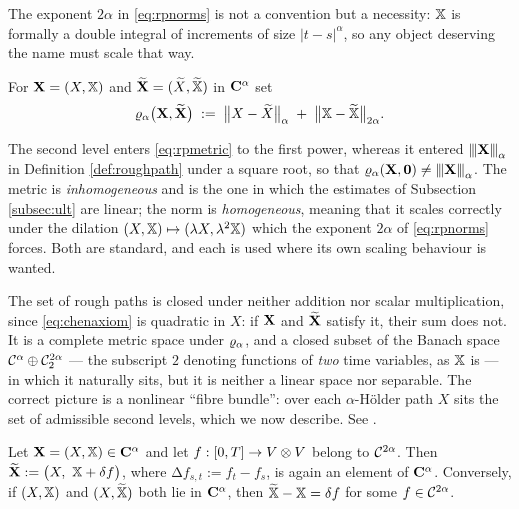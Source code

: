 The exponent $2\alpha$ in \eqref{eq:rpnorms} is not a convention but a necessity: $\mathbb{X}$ is
formally a double integral of increments of size $|t-s|^\alpha$, so any object deserving the name
must scale that way. 

\begin{definition}\label{def:rpmetric}
For $\mathbf{X} = (X,\mathbb{X})$ and $\widetilde{\mathbf{X}} = (\widetilde X, \widetilde{\mathbb{X}})$ in $\mathbf{C}^{\alpha}$ set
\begin{equation}\label{eq:rpmetric}
\varrho_{\alpha}\bigl(\mathbf{X},\widetilde{\mathbf{X}}\bigr) \;:=\; \bigl\lVert X - \widetilde X\bigr\rVert_{\alpha} \;+\; \bigl\lVert \mathbb{X} - \widetilde{\mathbb{X}}\bigr\rVert_{2\alpha}.
\end{equation}
\end{definition}

The second level enters \eqref{eq:rpmetric} to the first power, whereas it entered
${\left\vert\kern-0.25ex\left\vert\kern-0.25ex\left\vert \mathbf{X} \right\vert\kern-0.25ex\right\vert\kern-0.25ex\right\vert}_\alpha$ in Definition \ref{def:roughpath} under a square root, so that
$\varrho_{\alpha}(\mathbf{X},\mathbf{0}) \neq {\left\vert\kern-0.25ex\left\vert\kern-0.25ex\left\vert \mathbf{X}\right\vert\kern-0.25ex\right\vert\kern-0.25ex\right\vert}_\alpha$. The metric is
\emph{inhomogeneous} and is the one in which the estimates of Subsection \ref{subsec:ult} are
linear; the norm is \emph{homogeneous}, meaning that it scales correctly under the dilation
$(X,\mathbb{X})\mapsto(\lambda X,\lambda^2\mathbb{X})$ which the exponent $2\alpha$ of \eqref{eq:rpnorms}
forces. Both are standard, and each is used where its own scaling behaviour is wanted.

\begin{remark}\label{rem:notvectorspace}
The set of rough paths is closed under neither addition nor scalar multiplication, since
\eqref{eq:chenaxiom} is quadratic in $X$: if $\mathbf{X}$ and $\widetilde{\mathbf{X}}$ satisfy it, their sum does
not. It is a complete metric space under $\varrho_{\alpha}$, and a closed subset of the Banach space
$\mathcal{C}^{\alpha}\oplus \mathcal{C}^{2\alpha}_2$ --- the subscript $2$ denoting functions of \emph{two}
time variables, as $\mathbb{X}$ is --- in which it naturally sits, but it is neither a linear
space nor separable. The correct picture is a nonlinear ``fibre bundle'': over each $\alpha$-Hölder
path $X$ sits the set of admissible second levels, which we now describe. See \cite[Ch.\ 2]{frizhairer2020}.
\end{remark}

\begin{proposition}\label{prop:liftnotunique}
Let $\mathbf{X} = (X,\mathbb{X}) \in \mathbf{C}^{\alpha}$ and let $f : [0,T] \to V\otimes V$ belong to
$\mathcal{C}^{2\alpha}$. Then $\widetilde{\mathbf{X}} := \bigl(X,\ \mathbb{X} + \delta f\bigr)$, where
$\increment{f}_{s,t} := f_t - f_s$, is again an element of $\mathbf{C}^{\alpha}$. Conversely, if
$(X,\mathbb{X})$ and $(X,\widetilde{\mathbb{X}})$ both lie in $\mathbf{C}^{\alpha}$, then
$\widetilde{\mathbb{X}} - \mathbb{X} = \delta f$ for some $f \in \mathcal{C}^{2\alpha}$.
\end{proposition}

